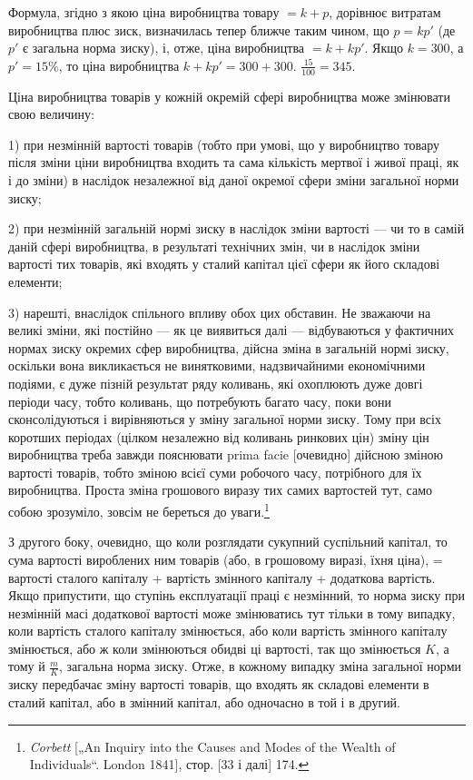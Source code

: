 Формула, згідно з якою ціна виробництва товару $= k + p$,
дорівнює витратам виробництва плюс зиск, визначилась тепер
ближче таким чином, що $p = kp'$ (де $p'$ є загальна норма зиску),
і, отже, ціна виробництва $= k + kp'$. Якщо $k = 300$, а $p' = 15\%$,
то ціна виробництва $k + kp' = 300 + 300$. $\frac{15}{100} = 345$.

Ціна виробництва товарів у кожній окремій сфері виробництва може змінювати свою величину:

1) при незмінній вартості товарів (тобто при умові, що у виробництво товару після зміни ціни
виробництва входить та сама
кількість мертвої і живої праці, як і до зміни) в наслідок незалежної від даної окремої сфери зміни
загальної норми зиску;

2) при незмінній загальній нормі зиску в наслідок зміни вартості — чи то в самій даній сфері
виробництва, в результаті
технічних змін, чи в наслідок зміни вартості тих товарів, які
входять у сталий капітал цієї сфери як його складові елементи;

3) нарешті, внаслідок спільного впливу обох цих обставин.
Не зважаючи на великі зміни, які постійно — як це виявиться
далі — відбуваються у фактичних нормах зиску окремих сфер
виробництва, дійсна зміна в загальній нормі зиску, оскільки
вона викликається не винятковими, надзвичайними економічними
подіями, є дуже пізній результат ряду коливань, які охоплюють
дуже довгі періоди часу, тобто коливань, що потребують багато часу, поки вони сконсолідуються і
вирівняються у зміну
загальної норми зиску. Тому при всіх коротших періодах (цілком незалежно від коливань ринкових цін)
зміну цін виробництва
треба завжди пояснювати prima facie [очевидно] дійсною зміною
вартості товарів, тобто зміною всієї суми робочого часу, потрібного для їх виробництва. Проста зміна
грошового виразу тих самих вартостей тут, само собою зрозуміло, зовсім не береться до уваги.\footnote{
\emph{Corbett} [„An Inquiry into the Causes and Modes of the Wealth of Individuals“.
London 1841], стор. [33 і далі] 174.
}

З другого боку, очевидно, що коли розглядати сукупний
суспільний капітал, то сума вартості вироблених ним товарів
(або, в грошовому виразі, їхня ціна), = вартості сталого капіталу + вартість змінного капіталу +
додаткова вартість. Якщо припустити, що ступінь експлуатації праці є незмінний, то норма зиску
при незмінній масі додаткової вартості може змінюватись тут
тільки в тому випадку, коли вартість сталого капіталу змінюється,
або коли вартість змінного капіталу змінюється, або ж коли змінюються обидві ці вартості, так що
змінюється $K$, а тому й $\frac{m}{K}$, загальна норма зиску. Отже, в кожному випадку зміна загальної
норми зиску передбачає зміну вартості товарів, що входять як
складові елементи в сталий капітал, або в змінний капітал, або
одночасно в той і в другий.
